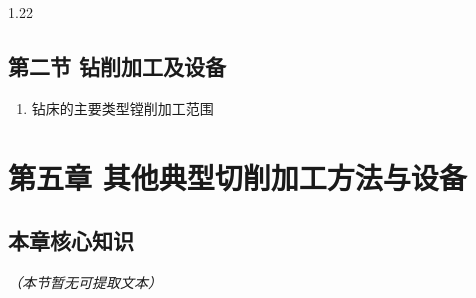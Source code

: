 \documentclass[12pt,a4paper]{article}
\begin{document}
\begin{spacing}{1.22}
\subsection{第二节 钻削加工及设备}
\begin{tcolorbox}[colback=yellow!6,colframe=red!55!black,title=重点,left=1mm,right=1mm]
\begin{enumerate}[leftmargin=2.2em,label=\arabic*.]
  \item 钻床的主要类型镗削加工范围
\end{enumerate}
\end{tcolorbox}

\section{第五章 其他典型切削加工方法与设备}
\subsection{本章核心知识}
\textit{（本节暂无可提取文本）}


\end{spacing}
\end{document}
